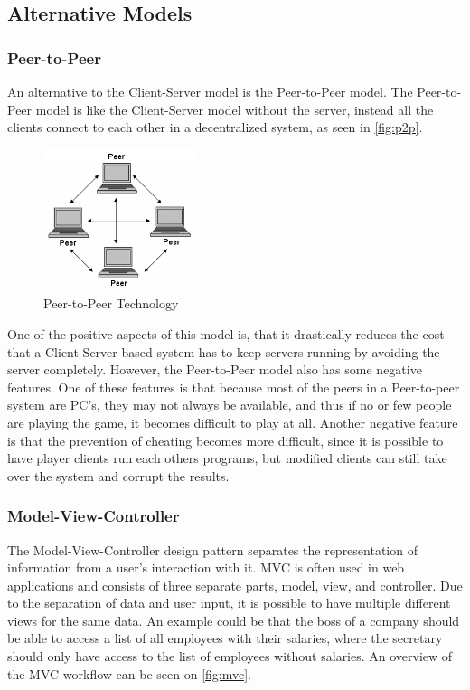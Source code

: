 \subsection{Alternative Models}

\subsubsection{Peer-to-Peer}
An alternative to the Client-Server model is the Peer-to-Peer model. The Peer-to-Peer model is like the Client-Server model without the server, instead all the clients connect to each other in a decentralized system, as seen in \autoref{fig:p2p}.

\begin{figure}[h]
  \centering
    \includegraphics[width=0.4\textwidth]{img/p2p.jpg}
  \caption{Peer-to-Peer Technology \citep{PeerToPeer}}
  \label{fig:p2p}
\end{figure}

One of the positive aspects of this model is, that it drastically reduces the cost that a Client-Server based system has to keep servers running by avoiding the server completely. However, the Peer-to-Peer model also has some negative features. One of these features is that because most of the peers in a Peer-to-peer system are PC's, they may not always be available, and thus if no or few people are playing the game, it becomes difficult to play at all. Another negative feature is that the prevention of cheating becomes more difficult, since it is possible to have player clients run each others programs, but modified clients can still take over the system and corrupt the results.\newline

\subsubsection{Model-View-Controller}
The Model-View-Controller design pattern separates the representation of information from a user's interaction with it. MVC is often used in web applications and consists of three separate parts, model, view, and controller. Due to the separation of data and user input, it is possible to have multiple different views for the same data. An example could be that the boss of a company should be able to access a list of all employees with their salaries, where the secretary should only have access to the list of employees without salaries. An overview of the MVC workflow can be seen on \autoref{fig:mvc}.\\


